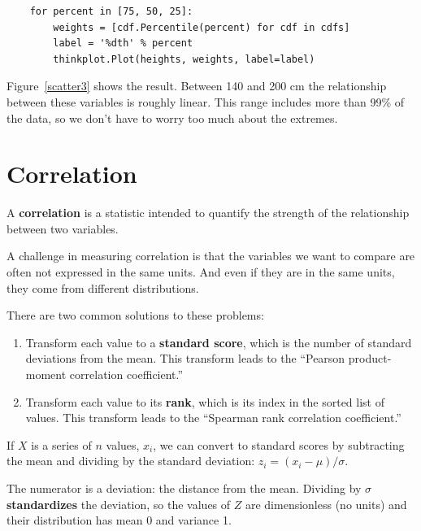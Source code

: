 \documentclass[12pt]{book}
\theoremstyle{exercise}
\begin{document}
\begin{verbatim}
    for percent in [75, 50, 25]:
        weights = [cdf.Percentile(percent) for cdf in cdfs]
        label = '%dth' % percent
        thinkplot.Plot(heights, weights, label=label)
\end{verbatim}

Figure~\ref{scatter3} shows the result.  Between 140 and 200 cm
the relationship between these variables is roughly linear.  This range
includes more than 99\% of the data, so we don't have to worry
too much about the extremes.%


\section{Correlation}

A {\bf correlation} is a statistic intended to quantify the strength
of the relationship between two variables.%

A challenge in measuring correlation is that the variables we want to
compare are often not expressed in the same units.  And even if they
are in the same units, they come from different distributions.%

There are two common solutions to these problems:

\begin{enumerate}

\item Transform each value to a {\bf standard score}, which is the
number of standard deviations from the mean.  
This transform leads to
the ``Pearson product-moment correlation coefficient.''%
%
%

\item Transform each value to its {\bf rank}, which is its index in
the sorted list of values.  This transform
leads to the ``Spearman rank correlation coefficient.''%
%
%

\end{enumerate}

If $X$ is a series of $n$ values, $x_i$, we can convert to standard
scores by subtracting the mean and dividing by the standard deviation:
$z_i = (x_i - \mu) / \sigma$.%
%

The numerator is a deviation: the distance from the mean.  Dividing by
$\sigma$ {\bf standardizes} the deviation, so the values of $Z$ are
dimensionless (no units) and their distribution has mean 0 and
variance 1.%
%
%
%
%
%
\end{document}
